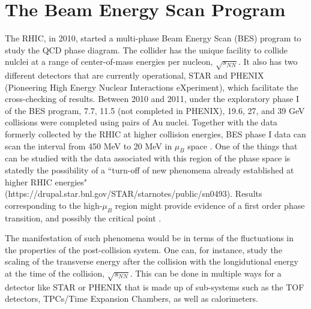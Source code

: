 \section{The Beam Energy Scan Program}
The RHIC, in 2010, started a multi-phase Beam Energy Scan (BES) program to study the QCD phase diagram. The collider has the unique facility to collide nulclei at a range of center-of-mass energies per nucleon, $\sqrt{s_{NN}}$. It also has two different detectors that are currently operational, STAR and PHENIX (Pioneering High Energy Nuclear Interactions eXperiment), which facilitate the cross-checking of results. Between 2010 and 2011, under the exploratory phase I of the BES program, 7.7, 11.5 (not completed in PHENIX), 19.6, 27, and 39 GeV collisions were completed using pairs of Au nuclei. Together with the data formerly collected by the RHIC at higher collision energies, BES phase I data can scan the interval from 450 MeV to 20 MeV in $\mu_{B}$ space \cite{1742-6596-455-1-012037, LUO201675}. One of the things that can be studied with the data associated with this region of the phase space is statedly the possibility of a ``turn-off of new phenomena already established at higher RHIC energies" (https://drupal.star.bnl.gov/STAR/starnotes/public/sn0493). Results corresponding to the high-$\mu_{B}$ region might provide evidence of a first order phase transition, and possibly the critical point \cite{LUO201675}.

The manifestation of such phenomena would be in terms of the fluctuations in the properties of the post-collision system. One can, for instance, study the scaling of the transverse energy after the collision with the longidutional energy at the time of the collision, $\sqrt{s_{NN}}$. This can be done in multiple ways for a detector like STAR or PHENIX that is made up of sub-systems such as the TOF detectors, TPCs/Time Expansion Chambers, as well as calorimeters. 

